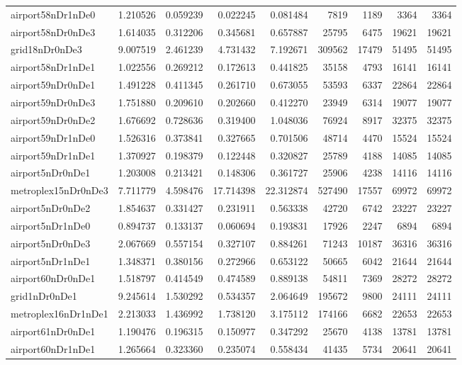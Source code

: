 \begin{longtable}{|l|r|r|r|r|r|r|r|r|}
airport58nDr1nDe0 & 1.210526 & 0.059239 & 0.022245 & 0.081484 & 7819 & 1189 & 3364 & 3364 \\
airport58nDr0nDe3 & 1.614035 & 0.312206 & 0.345681 & 0.657887 & 25795 & 6475 & 19621 & 19621 \\
grid18nDr0nDe3 & 9.007519 & 2.461239 & 4.731432 & 7.192671 & 309562 & 17479 & 51495 & 51495 \\
airport58nDr1nDe1 & 1.022556 & 0.269212 & 0.172613 & 0.441825 & 35158 & 4793 & 16141 & 16141 \\
airport59nDr0nDe1 & 1.491228 & 0.411345 & 0.261710 & 0.673055 & 53593 & 6337 & 22864 & 22864 \\
airport59nDr0nDe3 & 1.751880 & 0.209610 & 0.202660 & 0.412270 & 23949 & 6314 & 19077 & 19077 \\
airport59nDr0nDe2 & 1.676692 & 0.728636 & 0.319400 & 1.048036 & 76924 & 8917 & 32375 & 32375 \\
airport59nDr1nDe0 & 1.526316 & 0.373841 & 0.327665 & 0.701506 & 48714 & 4470 & 15524 & 15524 \\
airport59nDr1nDe1 & 1.370927 & 0.198379 & 0.122448 & 0.320827 & 25789 & 4188 & 14085 & 14085 \\
airport5nDr0nDe1 & 1.203008 & 0.213421 & 0.148306 & 0.361727 & 25906 & 4238 & 14116 & 14116 \\
metroplex15nDr0nDe3 & 7.711779 & 4.598476 & 17.714398 & 22.312874 & 527490 & 17557 & 69972 & 69972 \\
airport5nDr0nDe2 & 1.854637 & 0.331427 & 0.231911 & 0.563338 & 42720 & 6742 & 23227 & 23227 \\
airport5nDr1nDe0 & 0.894737 & 0.133137 & 0.060694 & 0.193831 & 17926 & 2247 & 6894 & 6894 \\
airport5nDr0nDe3 & 2.067669 & 0.557154 & 0.327107 & 0.884261 & 71243 & 10187 & 36316 & 36316 \\
airport5nDr1nDe1 & 1.348371 & 0.380156 & 0.272966 & 0.653122 & 50665 & 6042 & 21644 & 21644 \\
airport60nDr0nDe1 & 1.518797 & 0.414549 & 0.474589 & 0.889138 & 54811 & 7369 & 28272 & 28272 \\
grid1nDr0nDe1 & 9.245614 & 1.530292 & 0.534357 & 2.064649 & 195672 & 9800 & 24111 & 24111 \\
metroplex16nDr1nDe1 & 2.213033 & 1.436992 & 1.738120 & 3.175112 & 174166 & 6682 & 22653 & 22653 \\
airport61nDr0nDe1 & 1.190476 & 0.196315 & 0.150977 & 0.347292 & 25670 & 4138 & 13781 & 13781 \\
airport60nDr1nDe1 & 1.265664 & 0.323360 & 0.235074 & 0.558434 & 41435 & 5734 & 20641 & 20641 \\

\end{longtable}
